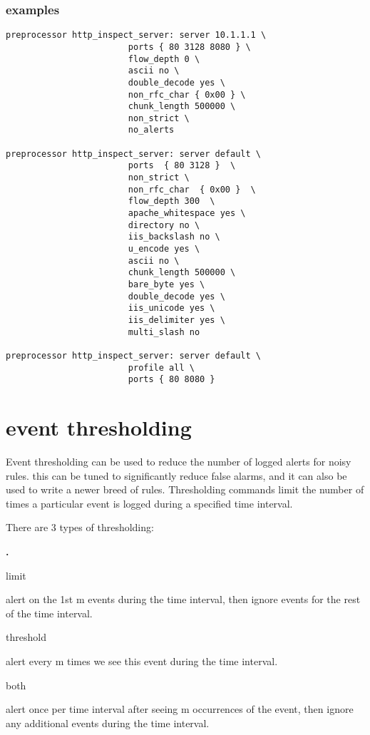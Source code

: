 \documentclass[english]{report}
\newcounter{slistnum}
\newenvironment{slist}{
    \begin{list}{
        {
            \bf \arabic{slistnum}.
        } 
    }{
        \usecounter{slistnum} 
    }
}{
    \end{list} 
}
\begin{document}
\subsubsection{examples}

\begin{verbatim}
preprocessor http_inspect_server: server 10.1.1.1 \
                        ports { 80 3128 8080 } \
                        flow_depth 0 \
                        ascii no \
                        double_decode yes \
                        non_rfc_char { 0x00 } \
                        chunk_length 500000 \
                        non_strict \
                        no_alerts

preprocessor http_inspect_server: server default \ 
                        ports  { 80 3128 }  \
                        non_strict \
                        non_rfc_char  { 0x00 }  \
                        flow_depth 300  \
                        apache_whitespace yes \
                        directory no \
                        iis_backslash no \
                        u_encode yes \
                        ascii no \
                        chunk_length 500000 \
                        bare_byte yes \
                        double_decode yes \
                        iis_unicode yes \ 
                        iis_delimiter yes \
                        multi_slash no

preprocessor http_inspect_server: server default \
                        profile all \
                        ports { 80 8080 }
\end{verbatim}

\newpage
\section{event thresholding}

Event thresholding can be used to reduce the number of logged alerts for noisy
rules.  this can be tuned to significantly reduce false alarms, and it can also
be used to write a newer breed of rules.  Thresholding commands limit the
number of times a particular event is logged during a specified time interval. 

There are 3 types of thresholding:

\begin{slist} 

\item limit 

alert on the 1st m events during the time interval, then ignore events for the
rest of the time interval.

\item threshold 

alert every m times we see this event during the time interval.

\item both 

alert once per time interval after seeing m occurrences of the event, then
ignore any additional events during the time interval.
\end{slist}
\end{document}
